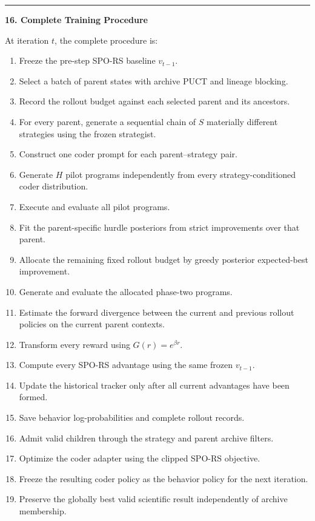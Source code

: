 \documentclass[
]{article}
\providecommand{\tightlist}{%
  \setlength{\itemsep}{0pt}\setlength{\parskip}{0pt}}
\begin{document}
\begin{center}\rule{0.5\linewidth}{0.5pt}\end{center}

\textbf{16. Complete Training Procedure}

At iteration \(t\), the complete procedure is:

\begin{enumerate}
\def\labelenumi{\arabic{enumi}.}
\tightlist
\item
  Freeze the pre-step SPO-RS baseline \(v_{t-1}\).
\item
  Select a batch of parent states with archive PUCT and lineage
  blocking.
\item
  Record the rollout budget against each selected parent and its
  ancestors.
\item
  For every parent, generate a sequential chain of \(S\) materially
  different strategies using the frozen strategist.
\item
  Construct one coder prompt for each parent--strategy pair.
\item
  Generate \(H\) pilot programs independently from every
  strategy-conditioned coder distribution.
\item
  Execute and evaluate all pilot programs.
\item
  Fit the parent-specific hurdle posteriors from strict improvements
  over that parent.
\item
  Allocate the remaining fixed rollout budget by greedy posterior
  expected-best improvement.
\item
  Generate and evaluate the allocated phase-two programs.
\item
  Estimate the forward divergence between the current and previous
  rollout policies on the current parent contexts.
\item
  Transform every reward using \(G(r)=e^{\beta r}\).
\item
  Compute every SPO-RS advantage using the same frozen \(v_{t-1}\).
\item
  Update the historical tracker only after all current advantages have
  been formed.
\item
  Save behavior log-probabilities and complete rollout records.
\item
  Admit valid children through the strategy and parent archive filters.
\item
  Optimize the coder adapter using the clipped SPO-RS objective.
\item
  Freeze the resulting coder policy as the behavior policy for the next
  iteration.
\item
  Preserve the globally best valid scientific result independently of
  archive membership.
\end{enumerate}
\end{document}
